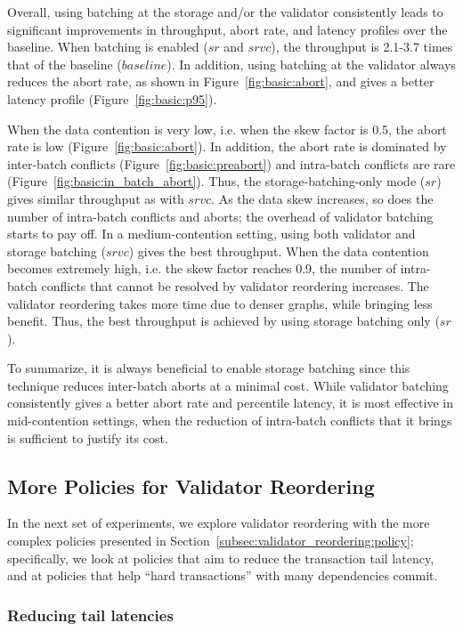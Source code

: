 Overall, using batching at the storage and/or the validator consistently leads to significant improvements in throughput, abort rate, and latency profiles over the baseline. When batching is enabled ($sr$ and $srvc$), the throughput is 2.1-3.7 times that of the baseline ($baseline$). In addition, using batching at the validator always reduces the abort rate, as shown in Figure~\ref{fig:basic:abort}, and gives a better latency profile (Figure~\ref{fig:basic:p95}).

When the data contention is very low, i.e. when the skew factor is 0.5, the abort rate is low (Figure~\ref{fig:basic:abort}). In addition, the abort rate is dominated by inter-batch conflicts (Figure~\ref{fig:basic:preabort}) and intra-batch conflicts are rare (Figure~\ref{fig:basic:in_batch_abort}). Thus, the storage-batching-only mode ($sr$) gives similar throughput as with $srvc$.  As the data skew increases, so does the number of intra-batch conflicts and aborts; the overhead of validator batching starts to pay off. In a medium-contention setting, using both validator and storage batching ($srvc$) gives the best throughput. When the data contention becomes extremely high, i.e. the skew factor reaches 0.9, the number of intra-batch conflicts that cannot be resolved by validator reordering increases. The validator reordering takes more time due to denser graphs, while bringing less benefit. Thus, the best throughput is achieved by using storage batching only ($sr$). 

To summarize, it is always beneficial to enable storage batching since this technique reduces inter-batch aborts at a minimal cost. While validator batching consistently gives a better abort rate and percentile latency, it is most effective in mid-contention settings, when the reduction of intra-batch conflicts that it brings is sufficient to justify its cost. 

\subsection{More Policies for Validator Reordering}


In the next set of experiments, we explore validator reordering with the more complex policies presented in Section~\ref{subsec:validator_reordering:policy}; specifically, we look at policies that aim to reduce the transaction tail latency, and at policies that help ``hard transactions'' with many dependencies commit.

\subsubsection{Reducing tail latencies}

